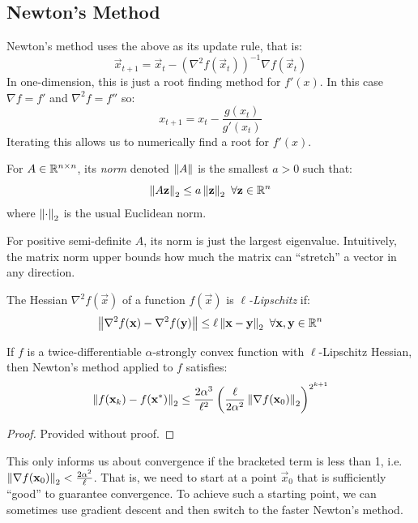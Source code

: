 \documentclass[../main.tex]{subfiles}
\begin{document}
\subsection{Newton's Method}
Newton's method uses the above as its update rule, that is:
\[
  \vec{x}_{t + 1} = \vec{x}_t - (\nabla^2 f(\vec{x}_t))^{-1} \nabla f(\vec{x}_t)
\]
In one-dimension, this is just a root finding method for $f'(x)$.
In this case $\nabla f = f'$ and $\nabla^2 f = f''$ so:
\[
  x_{t + 1} = x_t - \frac{g(x_t)}{g'(x_t)}
\]
Iterating this allows us to numerically find a root for $f'(x)$.
\begin{definition}
  For $A \in \mathbb{R}^{n\times n}$, its \textit{norm} denoted $\left\lVert A \right\rVert$ is the smallest $a > 0$ such that:
  \[
    \left\lVert A\mathbf{\bm{z}} \right\rVert_{2} \leq a \left\lVert \mathbf{\bm{z}} \right\rVert_{2}\ \forall \mathbf{\bm{z}} \in \mathbb{R}^{n}
  \]
  where $\left\lVert \cdot \right\rVert_2$ is the usual Euclidean norm.
\end{definition}
\begin{remark}
  For positive semi-definite $A$, its norm is just the largest eigenvalue.
  Intuitively, the matrix norm upper bounds how much the matrix can ``stretch'' a vector in any direction.
\end{remark}
\begin{definition}
  The Hessian $\nabla^2 f(\vec{x})$ of a function $f(\vec{x})$ is \textit{$\ell$-Lipschitz} if:
  \[
    \left\lVert \nabla^2 f(\mathbf{\bm{x}}) - \nabla^2 f(\mathbf{\bm{y}}) \right\rVert \leq \ell \left\lVert \mathbf{\bm{x}} - \mathbf{\bm{y}} \right\rVert_{2}\ \forall \mathbf{\bm{x}}, \mathbf{\bm{y}} \in \mathbb{R}^{n}
  \]
\end{definition}
\begin{theorem}
  If $f$ is a twice-differentiable $\alpha$-strongly convex function with $\ell$-Lipschitz Hessian, then Newton's method applied to $f$ satisfies:
  \[
    \left\lVert f(\mathbf{\bm{x}}_k) - f(\mathbf{\bm{x}}^{*}) \right\rVert_2 \leq \frac{2\alpha^3}{\ell^2}\left(\frac{\ell}{2\alpha^2}\left\lVert \nabla f(\mathbf{\bm{x}}_0) \right\rVert_2\right)^{2^{k + 1}}
  \]
\end{theorem}
\begin{proof}
  Provided without proof.
\end{proof}
\begin{remark}
  This only informs us about convergence if the bracketed term is less than 1, i.e. $\left\lVert \nabla f(\mathbf{\bm{x}}_0) \right\rVert_2 < \frac{2\alpha^2}{\ell}$.
  That is, we need to start at a point $\vec{x}_0$ that is sufficiently ``good'' to guarantee convergence.
  To achieve such a starting point, we can sometimes use gradient descent and then switch to the faster Newton's method.
\end{remark}
\end{document}
